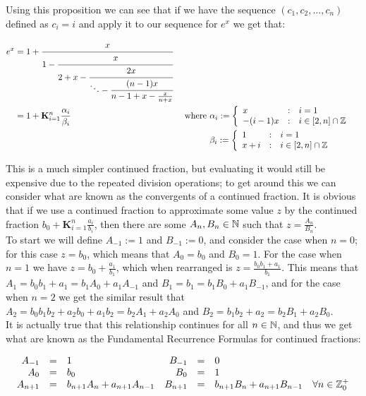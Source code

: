 Using this proposition we can see that if we have the sequence \((c_1, c_2, \ldots, c_n)\) defined as \(c_i = i\) and apply it to our sequence for \(e^x\) we get that:

\begin{align}
e^x &= 1 + \cfrac{x}{1 -
		   \cfrac{x}{2 + x - 
		   \cfrac{2x}{\ddots - 
		   \cfrac{(n-1)x}{n-1 + x - 
		   \frac{x}{n + x} } } } } \label{EQN_"exp cont frac 1 simp"}\\
	&= 1 + \mathbf{K}_{i=1}^n\frac{\alpha_i}{\beta_i} &\textrm{ where }
		&\alpha_i := \left\{\begin{array}{lcl}
			x&:&i=1\\
			-(i-1)x &:& i \in [2, n]\cap\mathbb{Z}
			\end{array}\right.\nonumber\\
	&	&&\beta_i := \left\{\begin{array}{lcl}
			1 &:& i=1\\
			x + i &:& i \in [2,n]\cap\mathbb{Z}
			\end{array}\right.\nonumber
\end{align}

This is a much simpler continued fraction, but evaluating it would still be expensive due to the repeated division operations; to get around this we can consider what are known as the convergents of a continued fraction. It is obvious that if we use a continued fraction to approximate some value \(z\) by the continued fraction \(b_0 + \mathbf{K}_{i=1}^n \frac{a_i}{b_i}\), then there are some \(A_n, B_n \in \mathbb{N}\) such that \(z = \frac{A_n}{B_n}\).\\

To start we will define \(A_{-1} := 1\) and \(B_{-1} := 0\), and consider the case when \(n = 0\); for this case \(z = b_0\), which means that \(A_0 = b_0\) and \(B_0 = 1\). For the case when \(n = 1\) we have \(z = b_0 + \frac{a_1}{b_1}\), which when rearranged is \(z = \frac{b_0b_1 + a_1}{b_1}\). This means that \(A_1 = b_0b_1 + a_1 = b_1A_0 + a_1A_{-1}\) and \(B_1 = b_1 = b_1B_0 + a_1B_{-1}\), and for the case when \(n = 2\) we get the similar result that \(A_2 = b_0b_1b_2 + a_2b_0 + a_1b_2 = b_2A_1 + a_2A_0\) and \(B_2 = b_1b_2 + a_2 = b_2 B_1 + a_2B_0\).\\

It is actually true that this relationship continues for all \(n \in \mathbb{N}\), and thus we get what are known as the Fundamental Recurrence Formulas for continued fractions:

\begin{displaymath}
\begin{array}{rclrclc}
	A_{-1} &=& 1 &B_{-1} &=& 0\\
	A_0 &=& b_0 &B_0 &=& 1\\
	A_{n+1} &=& b_{n+1}A_n + a_{n+1}A_{n-1}
	&B_{n+1}&=& b_{n+1}B_n + a_{n+1}B_{n-1} & \forall n \in \mathbb{Z}^+_0
\end{array}
\end{displaymath}

